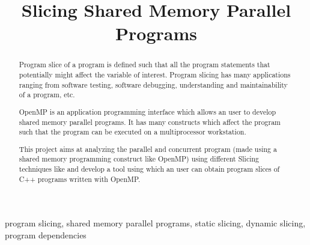 \documentclass[conference]{IEEEtran}
\begin{document}
\title{Slicing Shared Memory Parallel Programs\\
}

\author{
\and
{}
}

\maketitle

\begin{abstract}
Program slice of a program is defined such that all the program statements that potentially might affect the variable of interest. Program slicing has many applications ranging from software testing, software debugging, understanding and maintainability  of a program, etc. 
\par OpenMP is an application programming interface which allows an user to develop shared memory parallel programs. It has many constructs which affect the program such that the program can be executed on a multiprocessor workstation. 
\par This project aims at analyzing the parallel and concurrent program (made using a shared memory programming construct like OpenMP) using different Slicing techniques like  and develop a tool using which an user can obtain program slices of C++ programs written with OpenMP.
\end{abstract}

\begin{IEEEkeywords}
program slicing, shared memory parallel programs, static slicing, dynamic slicing, program dependencies
\end{IEEEkeywords}
\end{document}

